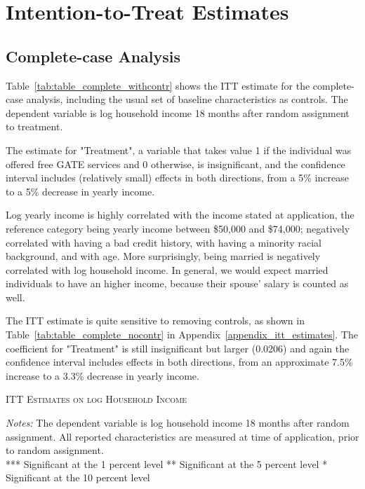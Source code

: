 
\section{Intention-to-Treat Estimates}

\subsection{Complete-case Analysis}

Table~\ref{tab:table_complete_withcontr} shows the ITT estimate for the complete-case analysis, including the usual set of baseline characteristics as controls. The dependent variable is log household income 18 months after random assignment to treatment.

The estimate for "Treatment", a variable that takes value 1 if the individual was offered free GATE services and 0 otherwise, is insignificant, and the confidence interval includes (relatively small) effects in both directions, from a 5\% increase to a 5\% decrease in yearly income.

Log yearly income is highly correlated with the income stated at application, the reference category being yearly income between \$50,000 and \$74,000; negatively correlated with having a bad credit history, with having a minority racial background, and with age. More surprisingly, being married is negatively correlated with log household income. In general, we would expect married individuals to have an higher income, because their spouse' salary is counted as well.

The ITT estimate is quite sensitive to removing controls, as shown in Table~\ref{tab:table_complete_nocontr} in Appendix~\ref{appendix_itt_estimates}. The coefficient for "Treatment" is still insignificant but larger (0.0206) and again the confidence interval includes effects in both directions, from an approximate 7.5\% increase to a 3.3\% decrease in yearly income.

\begin{table}[t!]
\centering
\caption{\textsc{ITT Estimates on log Household Income}}



\medskip
\begin{adjustbox}{width=0.825\textwidth, totalheight=\textheight, keepaspectratio}

\end{adjustbox}

\label{tab:table_complete_withcontr}
\bigskip
\raggedright
\footnotesize
\textit{Notes:} The dependent variable is log household income 18 months after random assignment. All reported characteristics are measured at time of application, prior to random assignment. \\
*** Significant at the 1 percent level ** Significant at the 5 percent level * Significant at the 10 percent level
\end{table}
